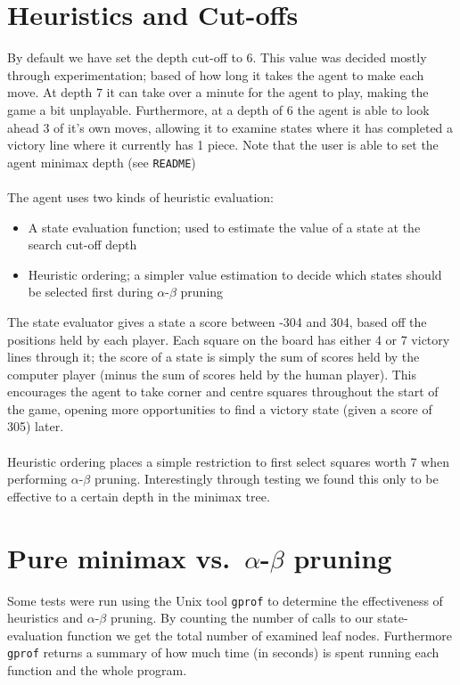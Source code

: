 \documentclass[10pt,twocolumn]{article}
\begin{document}
\section{Heuristics and Cut-offs}
By default we have set the depth cut-off to 6. This value was decided mostly 
through experimentation; based of how long it takes the agent to make each move.
At depth 7 it can take over a minute for the agent to play, making the game a bit unplayable.
Furthermore, at a depth of 6 the agent is able to look ahead 3 of it's own moves,
allowing it to examine states where it has completed a victory line where it currently
has 1 piece. Note that the user is able to set the agent minimax depth (see \texttt{README})\\\\
The agent uses two kinds of heuristic evaluation:
\begin{itemize}
\item[] A state evaluation function; used to estimate the value of a state at the
search cut-off depth
\item[] Heuristic ordering; a simpler value estimation to decide which states
should be selected first during $\alpha$-$\beta$ pruning
\end{itemize}
The state evaluator gives a state a score between -304 and 304, based off the positions held by
each player. Each square on the board has either 4 or 7 victory lines through it; the
score of a state is simply the sum of scores held by the computer player (minus the sum
of scores held by the human player). This encourages the agent to take corner and centre
squares throughout the start of the game, opening more opportunities to find a victory state 
(given a score of 305) later.\\\\
Heuristic ordering places a simple restriction to first select squares worth 7
when performing $\alpha$-$\beta$ pruning. Interestingly through testing we found
this only to be effective to a certain depth in the minimax tree.


\section{Pure minimax vs.\ $\alpha$-$\beta$ pruning}
Some tests were run using the Unix tool \texttt{gprof} to determine the effectiveness
of heuristics and $\alpha$-$\beta$ pruning. By counting the number of calls
to our state-evaluation function we get the total number of examined leaf nodes.
Furthermore \texttt{gprof} returns a summary of how much time (in seconds) is spent running
each function and the whole program.
\end{document}
